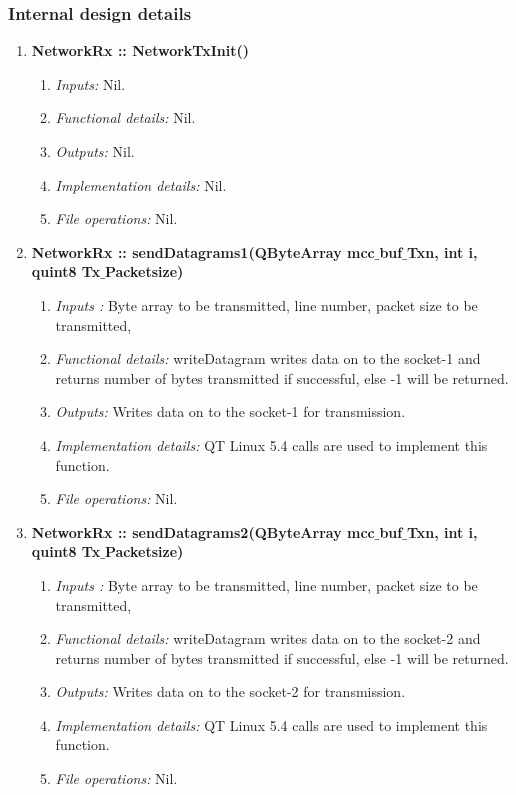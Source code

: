 \begin{enumerate}
\subsubsection{Internal design details }
\begin{enumerate}
	\item  \textbf{NetworkRx :: NetworkTxInit()}
	\begin{enumerate}
		\item \textit{Inputs:} Nil.
		\item \textit{Functional details:} Nil.
		\item \textit{Outputs:} Nil. 
		\item \textit{Implementation details:} Nil.
		\item \textit{File operations:} Nil.
	\end{enumerate}
	\item \textbf{NetworkRx :: sendDatagrams1(QByteArray mcc$\_$buf$\_$Txn,  int i, quint8 Tx$\_$Packetsize)}
	\begin{enumerate}
		\item \textit{Inputs :} Byte array to be transmitted, line number, packet size to be transmitted, 
		\item \textit{Functional details:}  writeDatagram writes data on to the socket-1 and returns number of bytes transmitted if successful, else -1 will be returned. 
		\item \textit{Outputs:} Writes data on to the socket-1 for transmission.
		\item \textit{Implementation details:} QT Linux 5.4 calls are used to implement this function.
		\item \textit{File operations:} Nil.
	\end{enumerate}  
	\item \textbf{NetworkRx :: sendDatagrams2(QByteArray mcc$\_$buf$\_$Txn,  int i, quint8 Tx$\_$Packetsize)}
	\begin{enumerate}
	\item \textit{Inputs :} Byte array to be transmitted, line number, packet size to be transmitted, 
	\item \textit{Functional details:}  writeDatagram writes data on to the socket-2 and returns number of bytes transmitted if successful, else -1 will be returned. 
	\item \textit{Outputs:} Writes data on to the socket-2 for transmission.
	\item \textit{Implementation details:} QT Linux 5.4 calls are used to implement this function.
	\item \textit{File operations:} Nil.
	\end{enumerate}  
\end{enumerate}



\end{enumerate}
